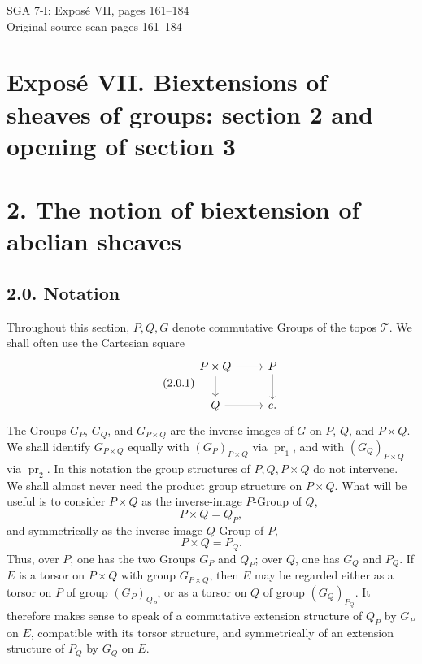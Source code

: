 \documentclass[11pt]{article}
\providecommand{\pr}{\operatorname{pr}}
\begin{document}
\begin{center}
{\Large SGA 7-I: Exposé VII, pages 161--184}\\[0.35em]
{\large Original source scan pages 161--184}
\end{center}

\section*{Exposé VII. Biextensions of sheaves of groups: section 2 and opening of section 3}

\section*{2. The notion of biextension of abelian sheaves}

\subsection*{2.0. Notation}
Throughout this section, \(P,Q,G\) denote commutative Groups of the topos \(\mathcal T\).  We shall often use the Cartesian square
\begin{equation}\tag{2.0.1}
\begin{tikzcd}
P\times Q \arrow[r] \arrow[d] & P\arrow[d]\\
Q\arrow[r] & e .
\end{tikzcd}
\end{equation}
The Groups \(G_P\), \(G_Q\), and \(G_{P\times Q}\) are the inverse images of \(G\) on \(P\), \(Q\), and \(P\times Q\).  We shall identify \(G_{P\times Q}\) equally with \((G_P)_{P\times Q}\) via \(\pr_1\), and with \((G_Q)_{P\times Q}\) via \(\pr_2\).  In this notation the group structures of \(P,Q,P\times Q\) do not intervene.  We shall almost never need the product group structure on \(P\times Q\).  What will be useful is to consider \(P\times Q\) as the inverse-image \(P\)-Group of \(Q\),
\begin{equation}\tag{2.0.2}
  P\times Q=Q_P,
\end{equation}
and symmetrically as the inverse-image \(Q\)-Group of \(P\),
\begin{equation}\tag{2.0.3}
  P\times Q=P_Q.
\end{equation}
Thus, over \(P\), one has the two Groups \(G_P\) and \(Q_P\); over \(Q\), one has \(G_Q\) and \(P_Q\).  If \(E\) is a torsor on \(P\times Q\) with group \(G_{P\times Q}\), then \(E\) may be regarded either as a torsor on \(P\) of group \((G_P)_{Q_P}\), or as a torsor on \(Q\) of group \((G_Q)_{P_Q}\).  It therefore makes sense to speak of a commutative extension structure of \(Q_P\) by \(G_P\) on \(E\), compatible with its torsor structure, and symmetrically of an extension structure of \(P_Q\) by \(G_Q\) on \(E\).
\end{document}
